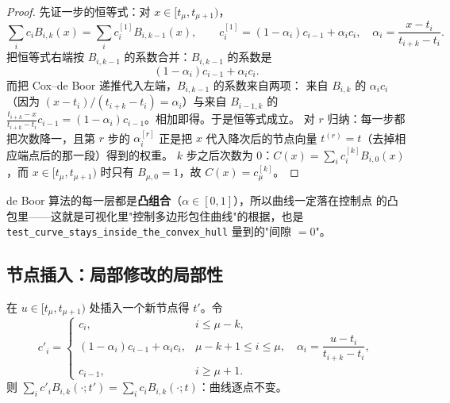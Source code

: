 \begin{proof}
先证一步的恒等式：对 $x\in[t_\mu,t_{\mu+1})$，
\[
\sum_i c_iB_{i,k}(x)=\sum_i c_i^{[1]}B_{i,k-1}(x),\qquad
c_i^{[1]}=(1-\alpha_i)c_{i-1}+\alpha_ic_i,\quad \alpha_i=\frac{x-t_i}{t_{i+k}-t_i}.
\]
把恒等式右端按 $B_{i,k-1}$ 的系数合并：$B_{i,k-1}$ 的系数是
\[
(1-\alpha_i)c_{i-1}+\alpha_ic_i .
\]
而把 Cox--de Boor 递推代入左端，$B_{i,k-1}$ 的系数来自两项：
来自 $B_{i,k}$ 的 $\alpha_i c_i$（因为 $(x-t_i)/(t_{i+k}-t_i)=\alpha_i$）与来自 $B_{i-1,k}$ 的
$\frac{t_{i+k}-x}{t_{i+k}-t_i}c_{i-1}=(1-\alpha_i)c_{i-1}$。相加即得。于是恒等式成立。
对 $r$ 归纳：每一步都把次数降一，且第 $r$ 步的 $\alpha_i^{[r]}$ 正是把
$x$ 代入降次后的节点向量 $t^{(r)}=t$（去掉相应端点后的那一段）得到的权重。
$k$ 步之后次数为 $0$：$C(x)=\sum_i c_i^{[k]}B_{i,0}(x)$，而 $x\in[t_\mu,t_{\mu+1})$
时只有 $B_{\mu,0}=1$，故 $C(x)=c_\mu^{[k]}$。
\end{proof}

\begin{remark}
de Boor 算法的每一层都是\textbf{凸组合}（$\alpha\in[0,1]$），所以曲线一定落在控制点
的凸包里——这就是可视化里"控制多边形包住曲线"的根据，也是
\texttt{test\_curve\_stays\_inside\_the\_convex\_hull} 量到的"间隙 $=0$"。
\end{remark}

\subsection{节点插入：局部修改的局部性}

\begin{theorem}
\label{thm:boehm}
在 $u\in[t_\mu,t_{\mu+1})$ 处插入一个新节点得 $t'$。令
\[
c'_i=\begin{cases}
c_i, & i\le\mu-k,\\
(1-\alpha_i)c_{i-1}+\alpha_ic_i, & \mu-k+1\le i\le\mu,\quad
\alpha_i=\dfrac{u-t_i}{t_{i+k}-t_i},\\
c_{i-1}, & i\ge\mu+1 .
\end{cases}
\]
则 $\sum_ic'_iB_{i,k}(\cdot;t')=\sum_ic_iB_{i,k}(\cdot;t)$：曲线逐点不变。
\end{theorem}

